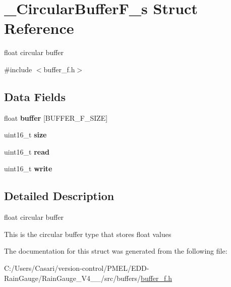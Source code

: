 \hypertarget{struct___circular_buffer_f__s}{}\section{\+\_\+\+Circular\+Buffer\+F\+\_\+s Struct Reference}
\label{struct___circular_buffer_f__s}


float circular buffer  




{\ttfamily \#include $<$buffer\+\_\+f.\+h$>$}

\subsection*{Data Fields}
\begin{DoxyCompactItemize}
\item 
\hypertarget{struct___circular_buffer_f__s_ae4e54290c31511d0530f368155c52b7a}{}float {\bfseries buffer} \mbox{[}B\+U\+F\+F\+E\+R\+\_\+\+F\+\_\+\+S\+I\+Z\+E\mbox{]}\label{struct___circular_buffer_f__s_ae4e54290c31511d0530f368155c52b7a}

\item 
\hypertarget{struct___circular_buffer_f__s_aaba88b24a21a6c70c895c0d55f4a69a0}{}uint16\+\_\+t {\bfseries size}\label{struct___circular_buffer_f__s_aaba88b24a21a6c70c895c0d55f4a69a0}

\item 
\hypertarget{struct___circular_buffer_f__s_a17fc9132ed0f45e5ef7a59e6a93abeb0}{}uint16\+\_\+t {\bfseries read}\label{struct___circular_buffer_f__s_a17fc9132ed0f45e5ef7a59e6a93abeb0}

\item 
\hypertarget{struct___circular_buffer_f__s_abac7c895b71c1b4d5b21beabca7ea63c}{}uint16\+\_\+t {\bfseries write}\label{struct___circular_buffer_f__s_abac7c895b71c1b4d5b21beabca7ea63c}

\end{DoxyCompactItemize}


\subsection{Detailed Description}
float circular buffer 

This is the circular buffer type that stores float values 

The documentation for this struct was generated from the following file\+:\begin{DoxyCompactItemize}
\item 
C\+:/\+Users/\+Casari/version-\/control/\+P\+M\+E\+L/\+E\+D\+D-\/\+Rain\+Gauge/\+Rain\+Gauge\+\_\+\+V4\+\_\+\_/src/buffers/\hyperlink{buffer__f_8h}{buffer\+\_\+f.\+h}\end{DoxyCompactItemize}
